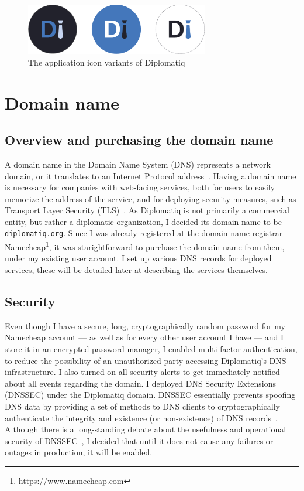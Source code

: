 \begin{figure}[!htb]
    \centering
    \includegraphics[width=8cm]{figures/diplomatiq-app-icons.pdf}
    \caption{The application icon variants of Diplomatiq}
    \label{fig:diplomatiq-app-icons}
\end{figure}

\section{Domain name}

\subsection{Overview and purchasing the domain name}

A domain name in the Domain Name System (DNS) represents a network domain, or it translates to an Internet Protocol address~\cite{rfc1035}. Having a domain name is necessary for companies with web-facing services, both for users to easily memorize the address of the service, and for deploying security measures, such as Transport Layer Security (TLS)~\cite{rfc8446}. As Diplomatiq is not primarily a commercial entity, but rather a diplomatic organization, I decided its domain name to be \lstinline{diplomatiq.org}. Since I was already registered at the domain name registrar Namecheap\footnote{https://www.namecheap.com}, it was starightforward to purchase the domain name from them, under my existing user account. I set up various DNS records for deployed services, these will be detailed later at describing the services themselves.

\subsection{Security}

Even though I have a secure, long, cryptographically random password for my Namecheap account — as well as for every other user account I have — and I store it in an encrypted password manager, I enabled multi-factor authentication, to reduce the possibility of an unauthorized party accessing Diplomatiq's DNS infrastructure. I also turned on all security alerts to get immediately notified about all events regarding the domain. I deployed DNS Security Extensions (DNSSEC) under the Diplomatiq domain. DNSSEC essentially prevents spoofing DNS data by providing a set of methods to DNS clients to cryptographically authenticate the integrity and existence (or non-existence) of DNS records~\cite{rfc4033}. Although there is a long-standing debate about the usefulness and operational security of DNSSEC~\cite{4159821, ptacek-dnssec-rant-2, ptacek-dnssec-rant-1}, I decided that until it does not cause any failures or outages in production, it will be enabled.

